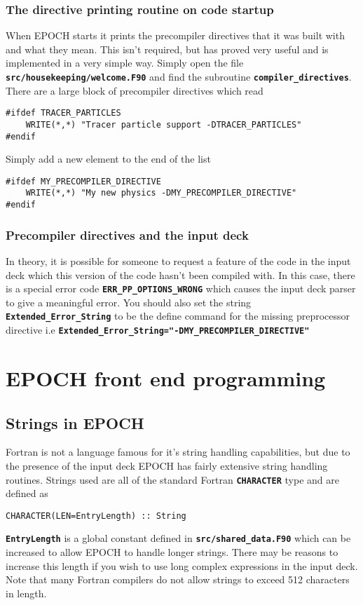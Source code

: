 \documentclass[12pt]{article}
\newcommand{\simpleboxverbatim}{\begin{Verbatim}[obeytabs=true,frame=single,
  framerule=0.5mm,rulecolor=\color{warwickmid}]}
\newcommand{\inlinecode}[1]{{\color{warwickred} \bf\texttt{#1}}}
\newcommand{\nEPOCH}{{\color{warwickdark}\fontfamily{phv}\selectfont EPOCH}}
\newcommand{\EPOCH}{{\nEPOCH} }
\begin{document}
\subsubsection{The directive printing routine on code startup}
When \EPOCH starts it prints the precompiler directives that it was built with
and what they mean. This isn't required, but has proved very useful and is
implemented in a very simple way.  Simply open the file
\inlinecode{src/housekeeping/welcome.F90} and find the subroutine
\inlinecode{compiler\_directives}. There are a large block of precompiler
directives which read

\simpleboxverbatim
#ifdef TRACER_PARTICLES
    WRITE(*,*) "Tracer particle support -DTRACER_PARTICLES"
#endif
\end{Verbatim}

Simply add a new element to the end of the list
\simpleboxverbatim
#ifdef MY_PRECOMPILER_DIRECTIVE
    WRITE(*,*) "My new physics -DMY_PRECOMPILER_DIRECTIVE"
#endif
\end{Verbatim}

\subsubsection{Precompiler directives and the input deck}
In theory, it is possible for someone to request a feature of the code in the
input deck which this version of the code hasn't been compiled with. In this
case, there is a special error code \inlinecode{ERR\_PP\_OPTIONS\_WRONG} which
causes the input deck parser to give a meaningful error. You should also set
the string \inlinecode{Extended\_Error\_String} to be the define command for
the missing preprocessor directive i.e
\inlinecode{Extended\_Error\_String="-DMY\_PRECOMPILER\_DIRECTIVE"}

\section{\EPOCH front end programming}

\subsection{Strings in \EPOCH}
Fortran is not a language famous for it's string handling capabilities, but due
to the presence of the input deck \EPOCH has fairly extensive string handling
routines. Strings used are all of the standard Fortran \inlinecode{CHARACTER}
type and are defined as
\simpleboxverbatim
CHARACTER(LEN=EntryLength) :: String
\end{Verbatim}
\inlinecode{EntryLength} is a global constant defined in
\inlinecode{src/shared\_data.F90} which can be increased to allow \EPOCH to
handle longer strings. There may be reasons to increase this length if you wish
to use long complex expressions in the input deck. Note that many Fortran
compilers do not allow strings to exceed 512 characters in length.
\end{document}
